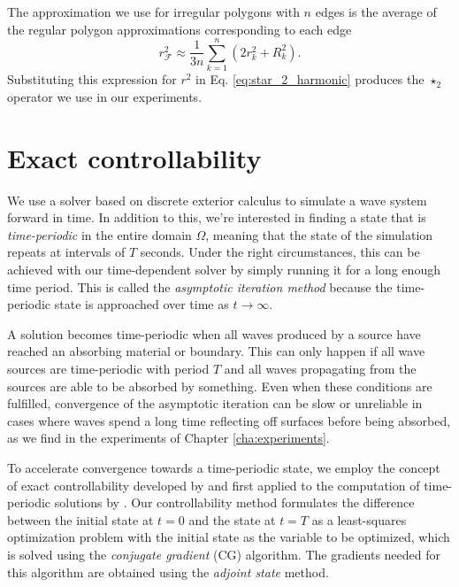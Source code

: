\documentclass[utf8,english]{gradu3}
\begin{document}
The approximation we use for irregular polygons with $n$ edges is the average
of the regular polygon approximations corresponding to each edge
\begin{equation}\label{eq:polygon_approx_radius}
  r^2_{\mathcal{F}} \approx \frac{1}{3n} \sum_{k=1}^n (2r_k^2 + R_k^2).
\end{equation}
Substituting this expression for $r^2$ in Eq. \eqref{eq:star_2_harmonic}
produces the $\star_2$ operator we use in our experiments.


\chapter{Exact controllability}\label{cha:controllability}

We use a solver based on discrete exterior calculus to simulate
a wave system forward in time.
In addition to this, we're interested in finding a state that is
\textit{time-periodic} in the entire domain $\Omega$,
meaning that the state of the simulation repeats at intervals of $T$ seconds.
Under the right circumstances, this can be achieved with our time-dependent solver
by simply running it for a long enough time period.
This is called the \textit{asymptotic iteration method}
because the time-periodic state is approached over time as $t \rightarrow \infty$.

A solution becomes time-periodic when all waves produced by a source
have reached an absorbing material or boundary.
This can only happen if all wave sources are time-periodic with period $T$
and all waves propagating from the sources are able to be absorbed by something.
Even when these conditions are fulfilled,
convergence of the asymptotic iteration can be slow or unreliable in cases
where waves spend a long time reflecting off surfaces before being absorbed,
as we find in the experiments of Chapter \ref{cha:experiments}.

To accelerate convergence towards a time-periodic state,
we employ the concept of exact controllability
developed by \textcite{lions_exact_1988}
and first applied to the computation of time-periodic solutions by
\textcite{bristeau_controllability_1998}.
Our controllability method formulates the difference between 
the initial state at $t=0$ and the state at $t=T$
as a least-squares optimization problem
with the initial state as the variable to be optimized,
which is solved using the \textit{conjugate gradient} (CG) algorithm.
The gradients needed for this algorithm are obtained
using the \textit{adjoint state} method.
\end{document}
